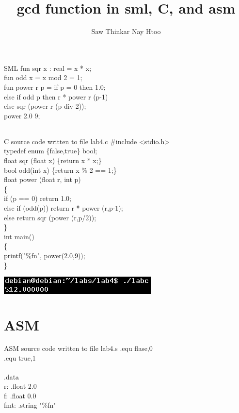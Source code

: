 \documentclass{article}
\title{gcd function in sml, C, and asm}
\begin{document}
 
\author{Saw Thinkar Nay Htoo}
\maketitle
\clearpage

\begin{GFT}{SML}
\+fun sqr x : real = x * x;\\
\+fun odd x = x mod 2 = 1;\\
\+fun power r p = if p = 0 then 1.0;\\
\+		else if odd p then r * power r (p-1)\\
\+		else sqr (power r (p div 2));\\
\+power 2.0 9;\\
\+\\
\end{GFT}
\begin{GFT}{C source code written to file lab4.c}
\+\#include <stdio.h>\\
\+typedef enum \{false,true\} bool;\\
\+float sqr (float x) \{return x * x;\}\\
\+bool odd(int x) \{return x \% 2 == 1;\}\\
\+float power (float r, int p)\\
\+\{\\
\+	if (p == 0) return 1.0;\\
\+	else if (odd(p)) return r * power (r,p-1);\\
\+	else return sqr (power (r,p/2));\\
\+\}\\
\+int main()\\
\+\{\\
\+	printf("\%f\Backslash{}n", power(2.0,9));\\
\+\}\\
\end{GFT}
\includegraphics[scale = 0.5]{labc.png}
\clearpage\section*{ASM}
\begin{GFT}{ASM source code written to file lab4.s}
\+.equ flase,0\\
\+.equ true,1\\
\+\\
\+.data\\
\+r: .float 2.0\\
\+f: .float 0.0\\
\+fmt: .string "\%f\Backslash{}n"\\
\+\\
\end{GFT}
\end{document}
